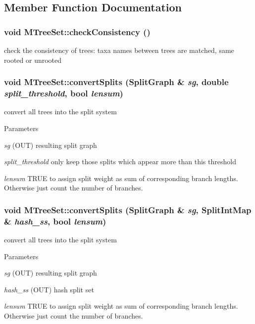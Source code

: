 \subsection{Member Function Documentation}
\hypertarget{classMTreeSet_a0ebff75dc397363dc55622ad094c4432}{
\subsubsection[{checkConsistency}]{\setlength{\rightskip}{0pt plus 5cm}void MTreeSet::checkConsistency ()}}
\label{classMTreeSet_a0ebff75dc397363dc55622ad094c4432}
check the consistency of trees: taxa names between trees are matched, same rooted or unrooted \hypertarget{classMTreeSet_a935eb55c363c816242dfa2c1f112cbec}{
\subsubsection[{convertSplits}]{\setlength{\rightskip}{0pt plus 5cm}void MTreeSet::convertSplits ({\bf SplitGraph} \& {\em sg}, \/  double {\em split\_\-threshold}, \/  bool {\em lensum})}}
\label{classMTreeSet_a935eb55c363c816242dfa2c1f112cbec}
convert all trees into the split system 
\begin{DoxyParams}{Parameters}
\item[{\em sg}](OUT) resulting split graph \item[{\em split\_\-threshold}]only keep those splits which appear more than this threshold \item[{\em lensum}]TRUE to assign split weight as sum of corresponding branch lengths. Otherwise just count the number of branches. \end{DoxyParams}
\hypertarget{classMTreeSet_ae973cf95e914256097ee21fd2491b89a}{
\subsubsection[{convertSplits}]{\setlength{\rightskip}{0pt plus 5cm}void MTreeSet::convertSplits ({\bf SplitGraph} \& {\em sg}, \/  {\bf SplitIntMap} \& {\em hash\_\-ss}, \/  bool {\em lensum})}}
\label{classMTreeSet_ae973cf95e914256097ee21fd2491b89a}
convert all trees into the split system 
\begin{DoxyParams}{Parameters}
\item[{\em sg}](OUT) resulting split graph \item[{\em hash\_\-ss}](OUT) hash split set \item[{\em lensum}]TRUE to assign split weight as sum of corresponding branch lengths. Otherwise just count the number of branches. \end{DoxyParams}
